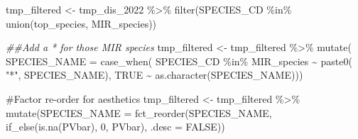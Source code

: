 \documentclass[
]{article}
\newenvironment{Shaded}{\begin{snugshade}}{\end{snugshade}}
\newcommand{\AttributeTok}[1]{\textcolor[rgb]{0.40,0.45,0.13}{#1}}
\newcommand{\CommentTok}[1]{\textcolor[rgb]{0.37,0.37,0.37}{#1}}
\newcommand{\ConstantTok}[1]{\textcolor[rgb]{0.56,0.35,0.01}{#1}}
\newcommand{\DecValTok}[1]{\textcolor[rgb]{0.68,0.00,0.00}{#1}}
\newcommand{\DocumentationTok}[1]{\textcolor[rgb]{0.37,0.37,0.37}{\textit{#1}}}
\newcommand{\FunctionTok}[1]{\textcolor[rgb]{0.28,0.35,0.67}{#1}}
\newcommand{\NormalTok}[1]{\textcolor[rgb]{0.00,0.23,0.31}{#1}}
\newcommand{\OtherTok}[1]{\textcolor[rgb]{0.00,0.23,0.31}{#1}}
\newcommand{\SpecialCharTok}[1]{\textcolor[rgb]{0.37,0.37,0.37}{#1}}
\newcommand{\StringTok}[1]{\textcolor[rgb]{0.13,0.47,0.30}{#1}}
\begin{document}
\begin{Shaded}
\begin{Highlighting}[]
\NormalTok{tmp\_filtered }\OtherTok{\textless{}{-}}\NormalTok{ tmp\_dis\_2022 }\SpecialCharTok{\%\textgreater{}\%}
  \FunctionTok{filter}\NormalTok{(SPECIES\_CD }\SpecialCharTok{\%in\%} \FunctionTok{union}\NormalTok{(top\_species, MIR\_species)) }
  
\DocumentationTok{\#\#Add a * for those MIR species}
\NormalTok{tmp\_filtered }\OtherTok{\textless{}{-}}\NormalTok{ tmp\_filtered }\SpecialCharTok{\%\textgreater{}\%} \FunctionTok{mutate}\NormalTok{(}
  \AttributeTok{SPECIES\_NAME =} \FunctionTok{case\_when}\NormalTok{(}
\NormalTok{    SPECIES\_CD }\SpecialCharTok{\%in\%}\NormalTok{ MIR\_species }\SpecialCharTok{\textasciitilde{}} \FunctionTok{paste0}\NormalTok{( }\StringTok{"*"}\NormalTok{, SPECIES\_NAME),}
    \ConstantTok{TRUE} \SpecialCharTok{\textasciitilde{}} \FunctionTok{as.character}\NormalTok{(SPECIES\_NAME)))}

\CommentTok{\#Factor re{-}order for aesthetics  }
\NormalTok{tmp\_filtered }\OtherTok{\textless{}{-}}\NormalTok{ tmp\_filtered }\SpecialCharTok{\%\textgreater{}\%}
  \FunctionTok{mutate}\NormalTok{(}\AttributeTok{SPECIES\_NAME =} 
           \FunctionTok{fct\_reorder}\NormalTok{(SPECIES\_NAME, }\FunctionTok{if\_else}\NormalTok{(}\FunctionTok{is.na}\NormalTok{(PVbar), }\DecValTok{0}\NormalTok{, PVbar), }\AttributeTok{.desc =} \ConstantTok{FALSE}\NormalTok{))}


\end{Highlighting}
\end{Shaded}
\end{document}
